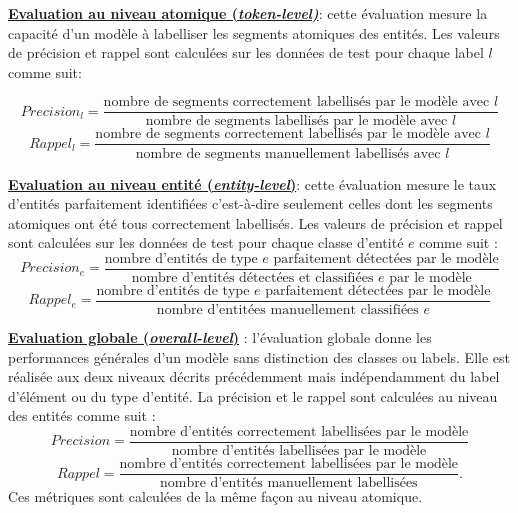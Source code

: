 \noindent \underline{\textbf{Evaluation au niveau atomique (\textit{token-level)}}}: cette évaluation mesure la capacité d'un modèle à labelliser les segments atomiques des entités. Les valeurs de précision et rappel sont calculées sur les données de test pour chaque label $l$ comme suit:

\[Precision_l = \frac{\text{nombre de segments correctement labellisés par le modèle avec } l} {\text{nombre de segments labellisés par le modèle avec } l}\]
\[Rappel_l = \frac{\text{nombre de segments correctement labellisés par le modèle avec } l} {\text{nombre de segments manuellement labellisés avec } l}\]

\vspace{0.3cm}

\noindent \underline{\textbf{Evaluation au niveau entité (\textit{entity-level})}}: cette évaluation mesure le taux d'entités parfaitement identifiées c'est-à-dire seulement celles dont les segments atomiques ont été tous correctement labellisés. Les valeurs de précision et rappel sont calculées sur les données de test pour chaque classe d'entité $e$ comme suit :
\[Precision_e = \frac{\text{nombre d'entités de type } e \text{ parfaitement détectées par le modèle}} {\text{nombre d'entités détectées et classifiées } e\text{ par le modèle}}\]
\[Rappel_e = \frac{\text{nombre d'entités de type } e \text{ parfaitement détectées par le modèle}} {\text{nombre d'entitées manuellement classifiées } e}\]

\vspace{0.3cm}

\noindent \underline{\textbf{Evaluation globale (\textit{overall-level})}} : l'évaluation globale donne les performances générales d'un modèle sans distinction des classes ou labels. Elle est réalisée aux deux niveaux décrits précédemment mais indépendamment du label d'élément ou du type d'entité. La précision et le rappel sont calculées au niveau des entités comme suit :
\[Precision = \frac{\text{nombre d'entités correctement labellisées par le modèle}} {\text{nombre d'entités labellisées par le modèle}}\]
\[Rappel = \frac{\text{nombre d'entités correctement labellisées par le modèle}} {\text{nombre d'entités  manuellement labellisées}}.\]
Ces métriques sont calculées de la même façon au niveau atomique.

